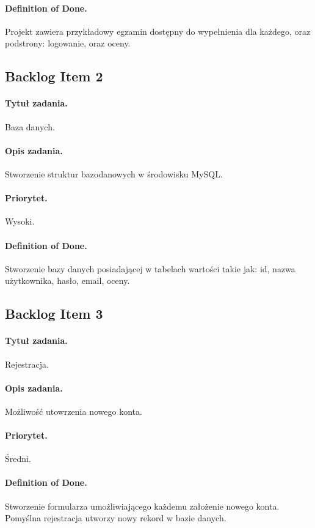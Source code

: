 \documentclass[a4paper]{article}
\begin{document}
\paragraph{Definition of Done.} Projekt zawiera przykładowy egzamin dostępny do wypełnienia dla każdego, oraz podstrony: logowanie, oraz oceny.

\subsection{Backlog Item 2}
\paragraph{Tytuł zadania.} Baza danych.
\paragraph{Opis zadania.} Stworzenie struktur bazodanowych w środowisku MySQL.
\paragraph{Priorytet.} Wysoki.
\paragraph{Definition of Done.} Stworzenie bazy danych posiadającej w tabelach wartości takie jak: id, nazwa użytkownika, hasło, email, oceny.

\subsection{Backlog Item 3}
\paragraph{Tytuł zadania.} Rejestracja.
\paragraph{Opis zadania.} Możliwość utowrzenia nowego konta.
\paragraph{Priorytet.} Średni.
\paragraph{Definition of Done.} Stworzenie formularza umożliwiającego każdemu założenie nowego konta. Pomyślna rejestracja utworzy nowy rekord w bazie danych.
\end{document}
